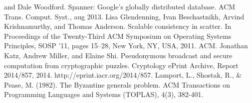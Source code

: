 \documentclass[conference]{IEEEtran}
\begin{document}
\begin{thebibliography}{00}
        and Dale Woodford. Spanner: Google’s globally distributed database. ACM
        Trans. Comput. Syst., aug 2013.
     Lisa Glendenning, Ivan Beschastnikh, Arvind Krishnamurthy,
        and Thomas Anderson. Scalable consistency in scatter. In Proceedings of
        the Twenty-Third ACM Symposium on Operating Systems Principles, SOSP
        ’11, pages 15–28, New York, NY, USA, 2011. ACM.
     Jonathan Katz, Andrew Miller, and Elaine Shi.
        Pseudonymous broadcast and secure computation from cryptographic
        puzzles. Cryptology ePrint Archive, Report 2014/857, 2014.
        http://eprint.iacr.org/2014/857.
     Lamport, L., Shostak, R., & Pease, M. (1982). The Byzantine
        generals problem. ACM Transactions on Programming Languages and Systems
        (TOPLAS), 4(3), 382-401.
\end{thebibliography}
\end{document}
